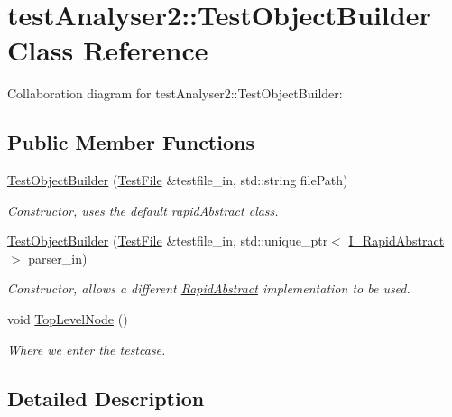 \hypertarget{classtestAnalyser2_1_1TestObjectBuilder}{}\section{test\+Analyser2\+::Test\+Object\+Builder Class Reference}
\label{classtestAnalyser2_1_1TestObjectBuilder}


Collaboration diagram for test\+Analyser2\+::Test\+Object\+Builder\+:
\subsection*{Public Member Functions}
\begin{DoxyCompactItemize}
\item 
\mbox{\hyperlink{classtestAnalyser2_1_1TestObjectBuilder_a0b0267e6742ee887c2eaebb74f8b3aae}{Test\+Object\+Builder}} (\mbox{\hyperlink{classtestAnalyser2_1_1TestFile}{Test\+File}} \&testfile\+\_\+in, std\+::string file\+Path)
\begin{DoxyCompactList}\small\item\em Constructor, uses the default rapid\+Abstract class. \end{DoxyCompactList}\item 
\mbox{\hyperlink{classtestAnalyser2_1_1TestObjectBuilder_a59a0f600c307a437dfe69d42f83868ff}{Test\+Object\+Builder}} (\mbox{\hyperlink{classtestAnalyser2_1_1TestFile}{Test\+File}} \&testfile\+\_\+in, std\+::unique\+\_\+ptr$<$ \mbox{\hyperlink{classtestAnalyser2_1_1I__RapidAbstract}{I\+\_\+\+Rapid\+Abstract}} $>$ parser\+\_\+in)
\begin{DoxyCompactList}\small\item\em Constructor, allows a different \mbox{\hyperlink{classtestAnalyser2_1_1RapidAbstract}{Rapid\+Abstract}} implementation to be used. \end{DoxyCompactList}\item 
void \mbox{\hyperlink{classtestAnalyser2_1_1TestObjectBuilder_a2186737583098c685304c215da5b3e1a}{Top\+Level\+Node}} ()
\begin{DoxyCompactList}\small\item\em Where we enter the testcase. \end{DoxyCompactList}\end{DoxyCompactItemize}


\subsection{Detailed Description}


